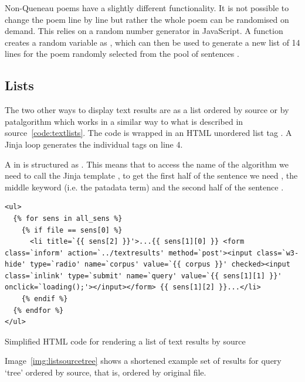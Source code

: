 Non-Queneau poems have a slightly different functionality. It is not possible to change the poem line by line but rather the whole poem can be randomised on demand. This relies on a random number generator in JavaScript. A function  creates a random variable  as , which can then be used to generate a new list of 14 lines for the poem randomly selected from the pool of sentences .


\subsection{Lists}

The two other ways to display text results are as a list ordered by source or by patalgorithm which works in a similar way to what is described in source~\ref{code:textlists}. The code is wrapped in an \ac{HTML} unordered list tag . A Jinja  loop generates the individual  tags on line 4.

A  in  is structured as . This means that to access the name of the algorithm we need to call the Jinja template , to get the first half of the sentence we need , the middle keyword (i.e. the patadata term)  and the second half of the sentence .

\begin{listing}[!htbp] %
  \begin{verbatim}
<ul>
  {% for sens in all_sens %}
    {% if file == sens[0] %}
      <li title=`{{ sens[2] }}'>...{{ sens[1][0] }} <form class=`inform' action=`../textresults' method=`post'><input class=`w3-hide' type=`radio' name=`corpus' value=`{{ corpus }}' checked><input class=`inlink' type=`submit' name=`query' value=`{{ sens[1][1] }}' onclick=`loading();'></input></form> {{ sens[1][2] }}...</li>
    {% endif %}
  {% endfor %}
</ul>
  \end{verbatim}
\caption[HTML for results by source]{Simplified \ac{HTML} code for rendering a list of text results by source}
\label{code:textlists}
\end{listing}

Image~\ref{img:listsourcetree} shows a shortened example set of results for query `tree' ordered by source, that is, ordered by original file.

